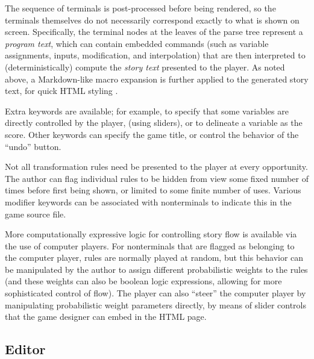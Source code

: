 \documentclass{acm_proc_article-sp}
\begin{document}
The sequence of terminals is post-processed before being rendered,
so the terminals themselves do not necessarily correspond exactly to what is shown on screen.
Specifically, the terminal nodes at the leaves of the parse tree represent a {\em program text},
which can contain embedded commands (such as variable assignments, inputs, modification, and interpolation)
that are then interpreted to (deterministically) compute the {\em story text} presented to the player.
As noted above, a Markdown-like macro expansion is further applied to the generated story text,
for quick HTML styling \cite{Markdown}.

Extra keywords are available; for example, to specify that some variables are directly controlled by the player,
(using sliders), or to delineate a variable as the score.
Other keywords can specify the game title, or control the behavior of the ``undo'' button.

Not all transformation rules need be presented to the player at every opportunity.
The author can flag individual rules to be hidden from view some fixed number of times
before first being shown, or limited to some finite number of uses.
Various modifier keywords can be associated with nonterminals to indicate this in the game source file.

More computationally expressive logic for controlling story flow is available via the use of computer players.
For nonterminals that are flagged as belonging to the computer player,
rules are normally played at random,
but this behavior can be manipulated by the author to
assign different probabilistic weights to the rules
(and these weights can also be boolean logic expressions, allowing for more sophisticated control of flow).
The player can also ``steer'' the computer player by manipulating probabilistic weight parameters directly,
by means of slider controls that the game designer can embed in the HTML page.

\subsection{Editor}
\end{document}
